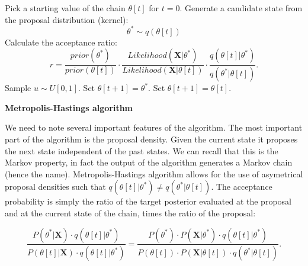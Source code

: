 \documentclass[12pt,twoside]{mitthesis}
\theoremstyle{plain}
\theoremstyle{definition}
\theoremstyle{remark}
\begin{document}
\begin{algorithm}
\begin{center}
\begin{algorithmic}[1]
\footnotesize{
%
\State Pick a starting value of the chain $\theta \left[ t \right]$ for $t=0$.
%
%
\State Generate a candidate state from the proposal distribution (kernel):
$$\theta^{*} \sim q(\theta[t])$$
%
\State Calculate the acceptance ratio:
$$r=\frac{prior\left(\theta^{*}\right)}{prior\left(\theta\left[t\right]\right)}\cdot\frac{Likelihood\left(\mathbf{X}|\theta^{*}\right)}{Likelihood\left(\mathbf{X}|\theta\left[t\right]\right)}\cdot\frac{q\left(\theta\left[t\right]|\theta^{*}\right)}{q\left(\theta^{*}|\theta\left[t\right]\right)}.$$
%
\State Sample $u\sim U[0,1]$.
%
%
\State Set $\theta[t+1]=\theta^*.$
%
\Else 
%
\State Set $\theta[t+1]=\theta[t].$
%
\EndIf
%
\EndFor
}
\end{algorithmic}
\end{center}
\caption{{ \footnotesize {\bf Metropolis-Hastings algorithm} 
}}
\label{alg:metropolisHastings}
\end{algorithm}

We need to note several important features of the algorithm.
The most important part of the algorithm is the proposal density. 
Given the current state it proposes the next state independent of the past states.
We can recall that this is the Markov property, in fact the output of the algorithm generates a Markov chain (hence the name).
Metropolis-Hastings algorithm allows for the use of asymetrical proposal densities such that $q\left(\theta\left[t\right]|\theta^{*}\right)\neq q\left(\theta^{*}|\theta\left[t\right]\right)$.
The acceptance probability is simply the ratio of the target posterior evaluated at the proposal and at the current state of the chain, times the ratio of the proposal: 

\begin{equation}
\frac{P\left(\theta^{*}|\mathbf{X}\right)\cdot q\left(\theta\left[t\right]|\theta^{*}\right)}{P\left(\theta\left[t\right]|\mathbf{X}\right)\cdot q\left(\theta\left[t\right]|\theta^{*}\right)}=\frac{P(\theta^{*})\cdot P\left(\mathbf{X}|\theta^{*}\right)\cdot q\left(\theta\left[t\right]|\theta^{*}\right)}{P(\theta\left[t\right])\cdot P\left(\mathbf{X}|\theta\left[t\right]\right)\cdot q\left(\theta^{*}|\theta\left[t\right]\right)}.
\label{eq:metropolis1}
\end{equation}
\end{document}
